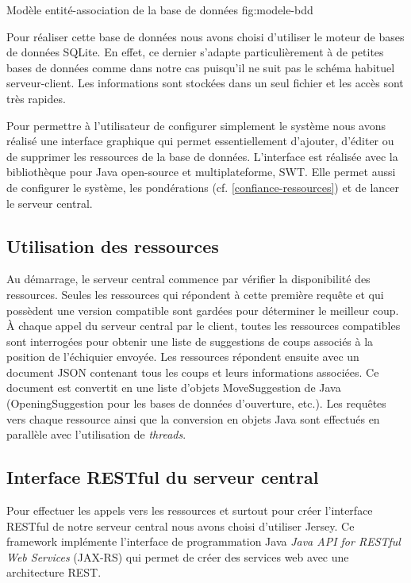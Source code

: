 \documentclass[a4paper,11pt]{article}
\begin{document}
{Modèle entité-association de la base de données}   
{fig:modele-bdd}

Pour réaliser cette base de données nous avons choisi d'utiliser le moteur de bases de données SQLite. En effet, ce dernier s'adapte particulièrement à de petites bases de données comme dans notre cas puisqu'il ne suit pas le schéma habituel serveur-client. Les informations sont stockées dans un seul fichier et les accès sont très rapides.

Pour permettre à l'utilisateur de configurer simplement le système nous avons réalisé une interface graphique qui permet essentiellement d'ajouter, d'éditer ou de supprimer les ressources de la base de données. L'interface est réalisée avec la bibliothèque pour Java open-source et multiplateforme, SWT. Elle permet aussi de configurer le système, les pondérations (cf. \ref{confiance-ressources}) et de lancer le serveur central.

\subsection{Utilisation des ressources}
Au démarrage, le serveur central commence par vérifier la disponibilité des ressources. Seules les ressources qui répondent à cette première requête et qui possèdent une version compatible sont gardées pour déterminer le meilleur coup.
À chaque appel du serveur central par le client, toutes les ressources compatibles sont interrogées pour obtenir une liste de suggestions de coups associés à la position de l'échiquier envoyée. Les ressources répondent ensuite avec un document JSON contenant tous les coups et leurs informations associées. Ce document est convertit en une liste d'objets MoveSuggestion de Java (OpeningSuggestion pour les bases de données d'ouverture, etc.).
Les requêtes vers chaque ressource ainsi que la conversion en objets Java sont effectués en parallèle avec l'utilisation de {\it threads}.

\subsection{Interface RESTful du serveur central}
Pour effectuer les appels vers les ressources et surtout pour créer l'interface RESTful de notre serveur central nous avons choisi d'utiliser Jersey. Ce framework implémente l'interface de programmation Java \textit{Java API for RESTful Web Services} (JAX-RS) qui permet de créer des services web avec une architecture REST.
\end{document}
